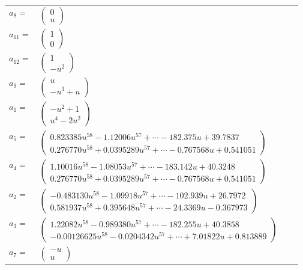 \documentclass[1p]{elsarticle_modified}
\theoremstyle{definition}
\begin{document}
\begin{tabular}{m{7pt} m{180pt} m{7pt} m{180pt} }
\flushright $a_{8}=$&$\begin{pmatrix}0\\u\end{pmatrix}$ \\
\flushright $a_{11}=$&$\begin{pmatrix}1\\0\end{pmatrix}$ \\
\flushright $a_{12}=$&$\begin{pmatrix}1\\- u^2\end{pmatrix}$ \\
\flushright $a_{9}=$&$\begin{pmatrix}u\\- u^3+u\end{pmatrix}$ \\
\flushright $a_{1}=$&$\begin{pmatrix}- u^2+1\\u^4-2 u^2\end{pmatrix}$ \\
\flushright $a_{5}=$&$\begin{pmatrix}0.823385 u^{58}-1.12006 u^{57}+\cdots-182.375 u+39.7837\\0.276770 u^{58}+0.0395289 u^{57}+\cdots-0.767568 u+0.541051\end{pmatrix}$ \\
\flushright $a_{4}=$&$\begin{pmatrix}1.10016 u^{58}-1.08053 u^{57}+\cdots-183.142 u+40.3248\\0.276770 u^{58}+0.0395289 u^{57}+\cdots-0.767568 u+0.541051\end{pmatrix}$ \\
\flushright $a_{2}=$&$\begin{pmatrix}-0.483130 u^{58}-1.09918 u^{57}+\cdots-102.939 u+26.7972\\0.581937 u^{58}+0.395648 u^{57}+\cdots-24.3369 u-0.367973\end{pmatrix}$ \\
\flushright $a_{3}=$&$\begin{pmatrix}1.22082 u^{58}-0.989380 u^{57}+\cdots-182.255 u+40.3858\\-0.00126625 u^{58}-0.0204342 u^{57}+\cdots+7.01822 u+0.813889\end{pmatrix}$ \\
\flushright $a_{7}=$&$\begin{pmatrix}- u\\u\end{pmatrix}$ \\

\end{tabular}
\end{document}

